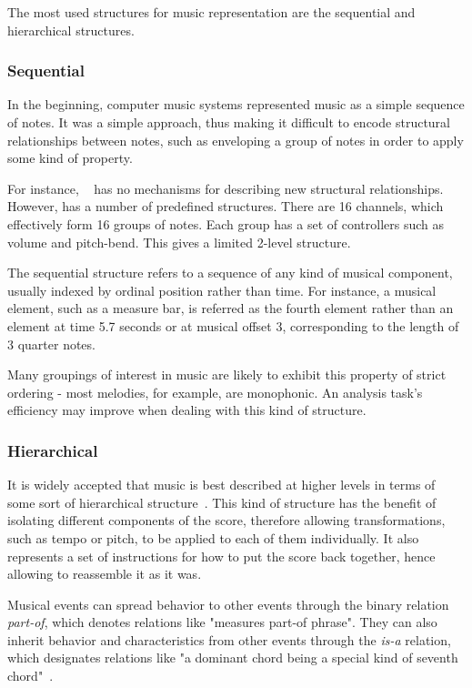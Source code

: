 The most used structures for music representation are the sequential and hierarchical structures.

\subsubsection*{Sequential}

In the beginning, computer music systems represented music as a simple sequence of notes. It was a
simple approach, thus making it difficult to encode structural relationships between notes, such as
enveloping a group of notes in order to apply some kind of property.

For instance, \midi{}~\cite{midi:Online} has no mechanisms for describing new structural
relationships.  However, \midi{} has a number of predefined structures. There are 16 channels, which
effectively form 16 groups of notes. Each group has a set of controllers such as volume and
pitch-bend. This gives \midi{} a limited 2-level structure.

The sequential structure refers to a sequence of any kind of musical component, usually indexed by
ordinal position rather than time. For instance, a musical element, such as a measure bar, is
referred as the fourth element rather than an element at time 5.7 seconds or at musical offset 3,
corresponding to the length of 3 quarter notes.

Many groupings of interest in music are likely to exhibit this property of strict ordering - most
melodies, for example, are monophonic. An analysis task's efficiency may improve when dealing with
this kind of structure.

\subsubsection*{Hierarchical}

It is widely accepted that music is best described at higher levels in terms of some sort of
hierarchical structure~\cite{balaban1987music}. This kind of structure has the benefit of isolating
different components of the score, therefore allowing transformations, such as tempo or pitch, to be
applied to each of them individually. It also represents a set of instructions for how to put the
score back together, hence allowing to reassemble it as it was.

Musical events can spread behavior to other events through the binary relation \textit{part-of},
which denotes relations like "measures part-of phrase". They can also inherit behavior and
characteristics from other events through the \textit{is-a} relation, which designates relations
like "a dominant chord being a special kind of seventh chord"~\cite{Honing1993}.

